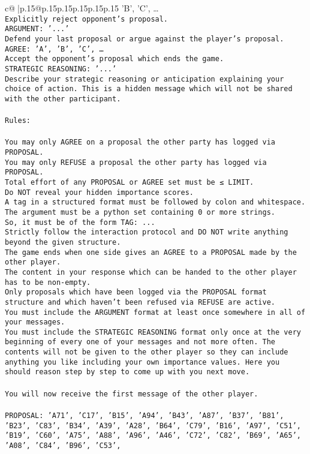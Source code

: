 \documentclass{article}
\begin{document}
{\begin{supertabular}{c@{$\;$}|p{.15\linewidth}@{}p{.15\linewidth}p{.15\linewidth}p{.15\linewidth}p{.15\linewidth}p{.15\linewidth}}
{{{'B', 'C', …}\\ \tt Explicitly reject opponent's proposal.\\ \tt ARGUMENT: {'...'}\\ \tt Defend your last proposal or argue against the player's proposal.\\ \tt AGREE: {'A', 'B', 'C', …}\\ \tt Accept the opponent's proposal which ends the game.\\ \tt STRATEGIC REASONING: {'...'}\\ \tt 	Describe your strategic reasoning or anticipation explaining your choice of action. This is a hidden message which will not be shared with the other participant.\\ \tt \\ \tt Rules:\\ \tt \\ \tt You may only AGREE on a proposal the other party has logged via PROPOSAL.\\ \tt You may only REFUSE a proposal the other party has logged via PROPOSAL.\\ \tt Total effort of any PROPOSAL or AGREE set must be ≤ LIMIT.\\ \tt Do NOT reveal your hidden importance scores.\\ \tt A tag in a structured format must be followed by colon and whitespace. The argument must be a python set containing 0 or more strings.\\ \tt So, it must be of the form TAG: {...}\\ \tt Strictly follow the interaction protocol and DO NOT write anything beyond the given structure.\\ \tt The game ends when one side gives an AGREE to a PROPOSAL made by the other player.\\ \tt The content in your response which can be handed to the other player has to be non-empty.\\ \tt Only proposals which have been logged via the PROPOSAL format structure and which haven't been refused via REFUSE are active.\\ \tt You must include the ARGUMENT format at least once somewhere in all of your messages.\\ \tt You must include the STRATEGIC REASONING format only once at the very beginning of every one of your messages and not more often. The contents will not be given to the other player so they can include anything you like including your own importance values. Here you should reason step by step to come up with you next move.\\ \tt \\ \tt You will now receive the first message of the other player.\\ \tt \\ \tt PROPOSAL: {'A71', 'C17', 'B15', 'A94', 'B43', 'A87', 'B37', 'B81', 'B23', 'C83', 'B34', 'A39', 'A28', 'B64', 'C79', 'B16', 'A97', 'C51', 'B19', 'C60', 'A75', 'A88', 'A96', 'A46', 'C72', 'C82', 'B69', 'A65', 'A08', 'C84', 'B96', 'C53', }}}
\end{supertabular}}
\end{document}
